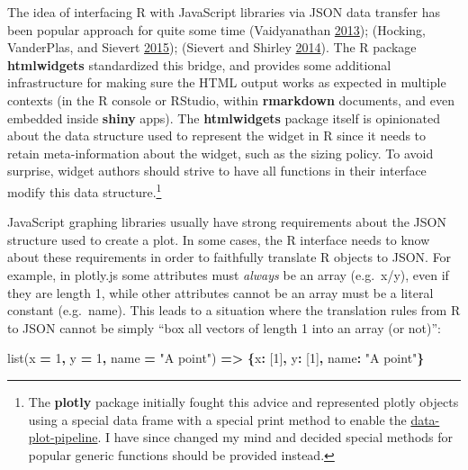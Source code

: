 \documentclass[12pt,]{isuthesis}
\newenvironment{Shaded}{\begin{snugshade}}{\end{snugshade}}
\newcommand{\DataTypeTok}[1]{\textcolor[rgb]{0.13,0.29,0.53}{{#1}}}
\newcommand{\DecValTok}[1]{\textcolor[rgb]{0.00,0.00,0.81}{{#1}}}
\newcommand{\StringTok}[1]{\textcolor[rgb]{0.31,0.60,0.02}{{#1}}}
\newcommand{\OperatorTok}[1]{\textcolor[rgb]{0.81,0.36,0.00}{\textbf{{#1}}}}
\newcommand{\AttributeTok}[1]{\textcolor[rgb]{0.77,0.63,0.00}{{#1}}}
\newcommand{\NormalTok}[1]{{#1}}
\let\rmarkdownfootnote\footnote%
\def\footnote{\protect\rmarkdownfootnote}
\begin{document}
The idea of interfacing R with JavaScript libraries via JSON data
transfer has been popular approach for quite some time (Vaidyanathan
\protect\hyperlink{ref-rCharts}{2013}); (Hocking, VanderPlas, and
Sievert \protect\hyperlink{ref-animint}{2015}); (Sievert and Shirley
\protect\hyperlink{ref-Sievert:2014b}{2014}). The R package
\textbf{htmlwidgets} standardized this bridge, and provides some
additional infrastructure for making sure the HTML output works as
expected in multiple contexts (in the R console or RStudio, within
\textbf{rmarkdown} documents, and even embedded inside \textbf{shiny}
apps). The \textbf{htmlwidgets} package itself is opinionated about the
data structure used to represent the widget in R since it needs to
retain meta-information about the widget, such as the sizing policy. To
avoid surprise, widget authors should strive to have all functions in
their interface modify this data structure.\footnote{The \textbf{plotly}
  package initially fought this advice and represented plotly objects
  using a special data frame with a special print method to enable the
  \protect\hyperlink{data-plot-pipeline}{data-plot-pipeline}. I have
  since changed my mind and decided special methods for popular generic
  functions should be provided instead.}

JavaScript graphing libraries usually have strong requirements about the
JSON structure used to create a plot. In some cases, the R interface
needs to know about these requirements in order to faithfully translate
R objects to JSON. For example, in plotly.js some attributes must
\emph{always} be an array (e.g.~x/y), even if they are length 1, while
other attributes cannot be an array must be a literal constant
(e.g.~name). This leads to a situation where the translation rules from
R to JSON cannot be simply ``box all vectors of length 1 into an array
(or not)'':

\begin{Shaded}
\begin{Highlighting}[]
\AttributeTok{list}\NormalTok{(x }\OperatorTok{=} \DecValTok{1}\OperatorTok{,} \NormalTok{y }\OperatorTok{=} \DecValTok{1}\OperatorTok{,} \NormalTok{name }\OperatorTok{=} \StringTok{"A point"}\NormalTok{) }\OperatorTok{=>} \OperatorTok{\{}\DataTypeTok{x}\OperatorTok{:} \NormalTok{[}\DecValTok{1}\NormalTok{]}\OperatorTok{,} \DataTypeTok{y}\OperatorTok{:} \NormalTok{[}\DecValTok{1}\NormalTok{]}\OperatorTok{,} \DataTypeTok{name}\OperatorTok{:} \StringTok{"A point"}\OperatorTok{\}}
\end{Highlighting}
\end{Shaded}
\end{document}
